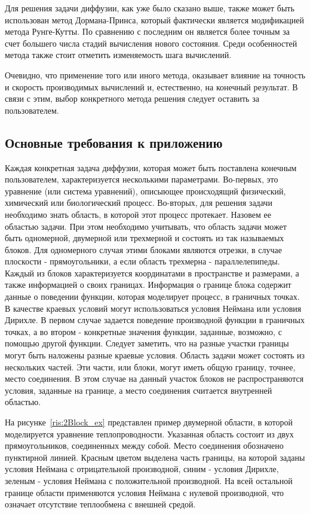 \documentclass[a4paper, 14pt]{extarticle}
\theoremstyle{definition}
\begin{document}
\par Для решения задачи диффузии, как уже было сказано выше, также может быть использован метод Дормана-Принса, который фактически является модификацией метода Рунге-Кутты. По сравнению с последним он является более точным за счет большего числа стадий вычисления нового состояния. Среди особенностей метода также стоит отметить изменяемость шага вычислений.

\par Очевидно, что применение того или иного метода, оказывает влияние на точность и скорость производимых вычислений и, естественно, на конечный результат. В связи с этим, выбор конкретного метода решения следует оставить за пользователем.

\subsection{Основные требования к приложению}

\par Каждая конкретная задача диффузии, которая может быть поставлена конечным пользователем, характеризуется несколькими параметрами. Во-первых, это уравнение (или система уравнений), описыющее происходящий физический, химический или биологический процесс. Во-вторых, для решения задачи необходимо знать область, в которой этот процесс протекает. Назовем ее областью задачи. При этом необходимо учитывать, что область задачи может быть одномерной, двумерной или трехмерной и состоять из так называемых блоков. Для одномерного случая этими блоками являются отрезки, в случае плоскости - прямоугольники, а если область трехмерна - параллелепипеды. Каждый из блоков характеризуется координатами в пространстве и размерами, а также информацией о своих границах. Информация о границе блока содержит данные о поведении функции, которая моделирует процесс, в граничных точках. В качестве краевых условий могут использоваться условия Неймана или условия Дирихле. В первом случае задается поведение производной функции в граничных точках, а во втором - конкретные значения функции, заданные, возможно, с помощью другой функции. Следует заметить, что на разные участки границы могут быть наложены разные краевые условия. Область задачи может состоять из нескольких частей. Эти части, или блоки, могут иметь общую границу, точнее, место соединения. В этом случае на данный участок блоков не распространяются условия, заданные на границе, а место соединения считается внутренней областью.

\par На рисунке~\ref{ris:2Block_ex} представлен пример двумерной области, в которой моделируется уравнение теплопроводности. Указанная область состоит из двух прямоугольников, соединенных между собой. Место соединения обозначено пунктирной линией. Красным цветом выделена часть границы, на которой заданы условия Неймана с отрицательной производной, синим - условия Дирихле, зеленым - условия Неймана с положительной производной. На всей остальной границе области применяются условия Неймана с нулевой производной, что означает отсутствие теплообмена с внешней средой.
\end{document}
